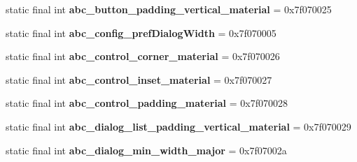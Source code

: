 \begin{DoxyCompactItemize}
\item 
\hypertarget{classandroid_1_1support_1_1v7_1_1appcompat_1_1_r_1_1dimen_aff8aac206e359494fadb9f6730581fe2}{}static final int {\bfseries abc\+\_\+button\+\_\+padding\+\_\+vertical\+\_\+material} = 0x7f070025\label{classandroid_1_1support_1_1v7_1_1appcompat_1_1_r_1_1dimen_aff8aac206e359494fadb9f6730581fe2}

\item 
\hypertarget{classandroid_1_1support_1_1v7_1_1appcompat_1_1_r_1_1dimen_a2977b61339311ee48206b57404b7d61d}{}static final int {\bfseries abc\+\_\+config\+\_\+pref\+Dialog\+Width} = 0x7f070005\label{classandroid_1_1support_1_1v7_1_1appcompat_1_1_r_1_1dimen_a2977b61339311ee48206b57404b7d61d}

\item 
\hypertarget{classandroid_1_1support_1_1v7_1_1appcompat_1_1_r_1_1dimen_a13f81d258daed6e1dcadc20a7aa5bc23}{}static final int {\bfseries abc\+\_\+control\+\_\+corner\+\_\+material} = 0x7f070026\label{classandroid_1_1support_1_1v7_1_1appcompat_1_1_r_1_1dimen_a13f81d258daed6e1dcadc20a7aa5bc23}

\item 
\hypertarget{classandroid_1_1support_1_1v7_1_1appcompat_1_1_r_1_1dimen_a65e3e7e15aaf39699c9b1817f971c427}{}static final int {\bfseries abc\+\_\+control\+\_\+inset\+\_\+material} = 0x7f070027\label{classandroid_1_1support_1_1v7_1_1appcompat_1_1_r_1_1dimen_a65e3e7e15aaf39699c9b1817f971c427}

\item 
\hypertarget{classandroid_1_1support_1_1v7_1_1appcompat_1_1_r_1_1dimen_ae9d833d10a6a830c2469c672675f9e19}{}static final int {\bfseries abc\+\_\+control\+\_\+padding\+\_\+material} = 0x7f070028\label{classandroid_1_1support_1_1v7_1_1appcompat_1_1_r_1_1dimen_ae9d833d10a6a830c2469c672675f9e19}

\item 
\hypertarget{classandroid_1_1support_1_1v7_1_1appcompat_1_1_r_1_1dimen_ad16958bf9ad6e69081193845b3ec8345}{}static final int {\bfseries abc\+\_\+dialog\+\_\+list\+\_\+padding\+\_\+vertical\+\_\+material} = 0x7f070029\label{classandroid_1_1support_1_1v7_1_1appcompat_1_1_r_1_1dimen_ad16958bf9ad6e69081193845b3ec8345}

\item 
\hypertarget{classandroid_1_1support_1_1v7_1_1appcompat_1_1_r_1_1dimen_abfb57f4c014c07b7c96b531d47074c89}{}static final int {\bfseries abc\+\_\+dialog\+\_\+min\+\_\+width\+\_\+major} = 0x7f07002a\label{classandroid_1_1support_1_1v7_1_1appcompat_1_1_r_1_1dimen_abfb57f4c014c07b7c96b531d47074c89}


\end{DoxyCompactItemize}
